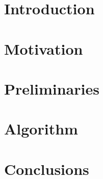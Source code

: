






\chapter{Introduction}

\chapter{Motivation}

\chapter{Preliminaries}


\chapter{Algorithm}


\chapter{Conclusions}

  \printbibliography[heading=bibintoc] %



